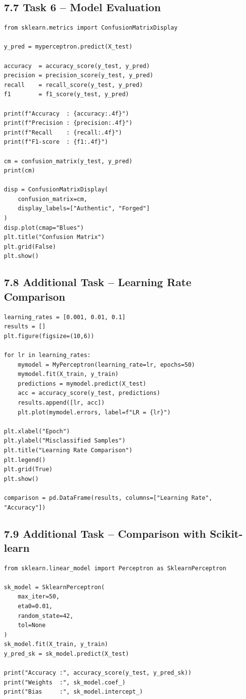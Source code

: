 \documentclass[11pt]{article}
\begin{document}
\subsection*{7.7 Task 6 -- Model Evaluation}
\begin{lstlisting}
from sklearn.metrics import ConfusionMatrixDisplay

y_pred = myperceptron.predict(X_test)

accuracy  = accuracy_score(y_test, y_pred)
precision = precision_score(y_test, y_pred)
recall    = recall_score(y_test, y_pred)
f1        = f1_score(y_test, y_pred)

print(f"Accuracy  : {accuracy:.4f}")
print(f"Precision : {precision:.4f}")
print(f"Recall    : {recall:.4f}")
print(f"F1-score  : {f1:.4f}")

cm = confusion_matrix(y_test, y_pred)
print(cm)

disp = ConfusionMatrixDisplay(
    confusion_matrix=cm,
    display_labels=["Authentic", "Forged"]
)
disp.plot(cmap="Blues")
plt.title("Confusion Matrix")
plt.grid(False)
plt.show()
\end{lstlisting}

\subsection*{7.8 Additional Task -- Learning Rate Comparison}
\begin{lstlisting}
learning_rates = [0.001, 0.01, 0.1]
results = []
plt.figure(figsize=(10,6))

for lr in learning_rates:
    mymodel = MyPerceptron(learning_rate=lr, epochs=50)
    mymodel.fit(X_train, y_train)
    predictions = mymodel.predict(X_test)
    acc = accuracy_score(y_test, predictions)
    results.append([lr, acc])
    plt.plot(mymodel.errors, label=f"LR = {lr}")

plt.xlabel("Epoch")
plt.ylabel("Misclassified Samples")
plt.title("Learning Rate Comparison")
plt.legend()
plt.grid(True)
plt.show()

comparison = pd.DataFrame(results, columns=["Learning Rate", "Accuracy"])
\end{lstlisting}

\subsection*{7.9 Additional Task -- Comparison with Scikit-learn}
\begin{lstlisting}
from sklearn.linear_model import Perceptron as SklearnPerceptron

sk_model = SklearnPerceptron(
    max_iter=50,
    eta0=0.01,
    random_state=42,
    tol=None
)
sk_model.fit(X_train, y_train)
y_pred_sk = sk_model.predict(X_test)

print("Accuracy :", accuracy_score(y_test, y_pred_sk))
print("Weights  :", sk_model.coef_)
print("Bias     :", sk_model.intercept_)
\end{lstlisting}
\end{document}
